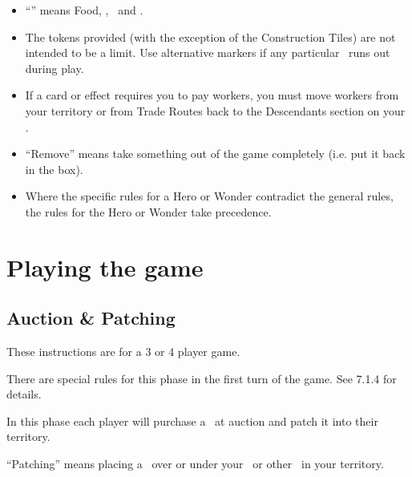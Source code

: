 \documentclass[10pt,twocolumn]{article}
\begin{document}
\begin{itemize}
\item ``\goods'' means Food, \minerals, \vps\ and \money.

\item The tokens provided (with the exception of the Construction Tiles) are not intended to be a limit. Use alternative markers if any particular \good\ runs out during play.

\item If a card or effect requires you to pay workers, you must move workers from your territory or from Trade Routes back to the Descendants section on your \psb.

\item ``Remove'' means take something out of the game completely (i.e. put it back in the box).
\item Where the specific rules for a Hero or Wonder contradict the general rules, the rules for the Hero or Wonder take precedence.
\end{itemize}
\section{Playing the game}
\subsection{Auction \& Patching \landcards}
These instructions are for a 3 or 4 player game.

There are special rules for this phase in the first turn of the game. See 7.1.4 for details.

In this phase each player will purchase a \landcard\ at auction and patch it into their territory.

``Patching'' means placing a \landcard\ over or under your \baseland\ or other \landcards\ in your territory.
\end{document}
